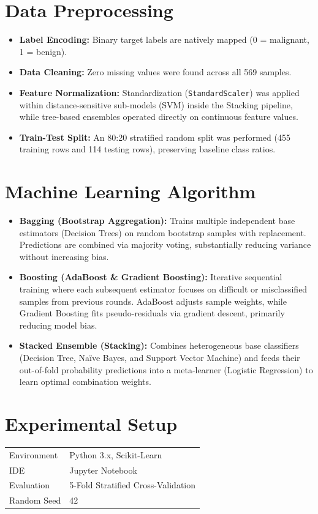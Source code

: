 \documentclass[12pt,a4paper]{article}
\begin{document}
\section{Data Preprocessing}
\begin{itemize}
\item \textbf{Label Encoding:} Binary target labels are natively mapped (0 = malignant, 1 = benign).
\item \textbf{Data Cleaning:} Zero missing values were found across all 569 samples.
\item \textbf{Feature Normalization:} Standardization (\texttt{StandardScaler}) was applied within distance-sensitive sub-models (SVM) inside the Stacking pipeline, while tree-based ensembles operated directly on continuous feature values.
\item \textbf{Train-Test Split:} An 80:20 stratified random split was performed (455 training rows and 114 testing rows), preserving baseline class ratios.
\end{itemize}

\section{Machine Learning Algorithm}
\begin{itemize}
\item \textbf{Bagging (Bootstrap Aggregation):} Trains multiple independent base estimators (Decision Trees) on random bootstrap samples with replacement. Predictions are combined via majority voting, substantially reducing variance without increasing bias.
\item \textbf{Boosting (AdaBoost \& Gradient Boosting):} Iterative sequential training where each subsequent estimator focuses on difficult or misclassified samples from previous rounds. AdaBoost adjusts sample weights, while Gradient Boosting fits pseudo-residuals via gradient descent, primarily reducing model bias.
\item \textbf{Stacked Ensemble (Stacking):} Combines heterogeneous base classifiers (Decision Tree, Na\"ive Bayes, and Support Vector Machine) and feeds their out-of-fold probability predictions into a meta-learner (Logistic Regression) to learn optimal combination weights.
\end{itemize}

\section{Experimental Setup}
\begin{tabular}{ll}
\toprule
Environment & Python 3.x, Scikit-Learn \\
IDE & Jupyter Notebook \\
Evaluation & 5-Fold Stratified Cross-Validation \\
Random Seed & 42 \\
\bottomrule
\end{tabular}
\end{document}
